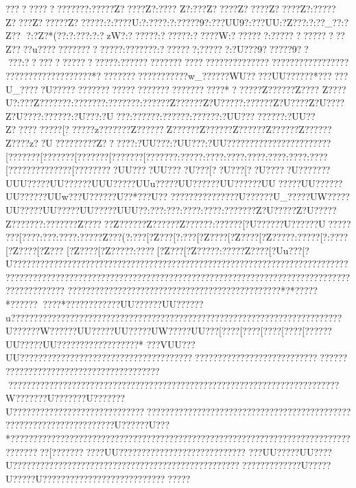 {{{{{{{{{{{{{{{{{{{{{{{{{{{{{{{{{{{{{{{{{{{{{{{{{{{{{{{{{{{{{{{{{{{{{{{{{{{{{{{{{{{{{{{{{{{{{{{{{{{{{{{{{{{{{{{{{{{{{{{{{{{{{{{{{{{{{{{{{{{{{{{{{{{{{{{{{{{{{{{{{{{{{{{{{{{{{{{{{{{{{{{{{{{{{{{{{{{{{{{{{{{{{{{{{{{{{{????????????????:?????Z????? Z?:???? Z?:???Z????? Z????? Z????? Z?:?????Z????Z??????Z??????:?:????U:?:???? :?:?????9?:???UU9?:???UU:?Z?  ??:?:??_??:?Z??
?:?Z?*(??:?:???:?:?zW?:??????:??????:?????W:???????:??????????????Z????u?????????????????:???????:???????;??????:?U???9??????9?????:?????????????????:???????????????????????????????????????????????????????????????????*???????????????????w_??????WU?????UU??????*??????U_?????U???????????????????????????????????*????? {?Z?????{?Z????
Z?{? ??U{?:?? {?Z???????:???????:???????:?????{?Z?????{?Z?U?????:?????{?Z?U???{?Z?U???{?Z?U???{?:?????{?:?U??{?:?U??{?:?????{?:?????{?:?????{?:?UU??{??????{?:?UU??Z????  {??????[??????z???????Z??????Z?????? Z?????? Z?????? Z?????? Z?????? Z???? z??U??{???????Z???? ??:?UU??{?:?UU??{?:?UU??{???????{???????{???????[???????[???????[???????[???????[???????:?????  :????  :????  :????  :????  :????  :????  [???????{???????[???????{??UU??{??UU??{??U???[??U???[??U???{??U???????UUU?????UU??????UUU?????UUu?????UU??????UU??????UU?????UU??????UU??????UUw???U?????{?U??*??{?U??
??{???? {??? ?????{?U?????{?U_????{?UW????{?UU????{?UU????{?UU????{?UUU?{?:??   {?:??   {?:???  {?:??   ??:???????Z?U?????Z?U?????Z???????:???????Z??????Z???? ??Z???? ??Z???? ??:???? ??[?U?????{?U?????{?U??{???  
???[???{?:??   {?:???  {?:???? {?Z???( {?:???  [?Z???  [?:???  [?Z???? [?Z???? [?Z???? {?:?????[?:???? [?Z???? [?Z??? [?Z???? [?Z???? {?:????[?Z???  [?Z???? {?:???? {?Z???{?[?Uu??{?[?U???????????????????????????????????????????????????????????????????????????????????????????????????????????????????????????????????????????????????????????????????
?????????????????????????????{??????????????????*?*??{???*???{?????{??*  ??{??   ??{??   ????UU??????UU??????u???????????????????????????????????{???????{?????{???????{???????{?????{?????{?{?U?????{?W?????{?UU????{?UU????{?UW????{?UU??{?[???  {?[???  {?[???  {?[???  {?[???  ??{?UU????{?UU??{?{?????{?{?????{?{???*
{?{??VUU??{?UU????????? ??????????????? ??????? ?????????????? ??????? ??????? ?????? ??????  ??????  ??????  ??????? ?????????????????????  ??????  ??????  ??????  ??????  ??????  ??????  ??????  ??????? ?????? ????????????W???????U???????U???????U???????????????? ??????? ?????? ??????  ????????????????????? ??????????{???????????????????????{???{??????U{??????U{???*?????{???????{?????{???????{???????{???????{?????{???????{???????{???????{???????{???????{??????[???  ??{??  ????UU????????????????????{????????   
???UU?????UU? ???U?? ????  ????? ??????? ??????? ????? ????? ????? ????? ????? ????  ???? ?????U?????U?????U????? ??????????? ???????????????? 
}}}}}}}}}}}}}}}}}}}}}}}}}}}}}}}}}}}}}}}}}}}}}}}}}}}}}}}}}}}}}}}}}}}}}}}}}}}}}}}}}}}}}}}}}}}}}}}}}}}}}}}}}}}}}}}}}}}}}}}}}}}}}}}}}}}}}}}}}}}}}}}}}}}}}}}}}}}}}}}}}}}}}}}}}}}}}}}}}}}}}}}}}}}}}}}}}}}}}}}}}}}}}}}}}}}}}}}}}}}}}}}}}}}}}}}}}}}}}}}}}}}}}}}}}}}}}}}}}}}}}}}}}}}}}}}}}}}}}}}}}}}}}}}}}}}}}}}}}}}}}}}}}}}}}}}}}}}}}}}}}}}}}}}}
